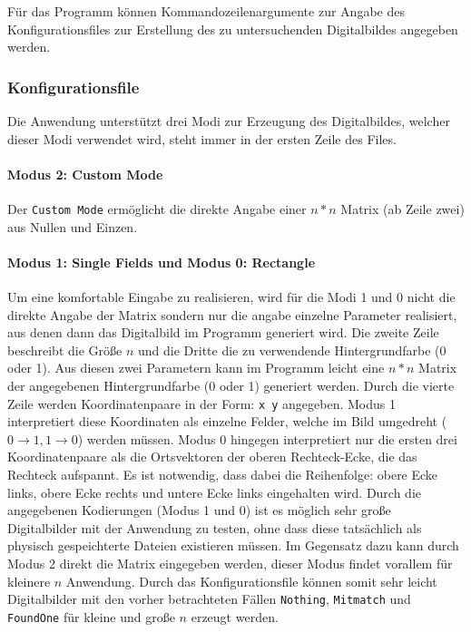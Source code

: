 Für das Programm können Kommandozeilenargumente zur Angabe des Konfigurationsfiles zur Erstellung des zu untersuchenden Digitalbildes angegeben werden.

\subsubsection{Konfigurationsfile}
Die Anwendung unterstützt drei Modi zur Erzeugung des Digitalbildes, welcher dieser Modi verwendet wird, steht immer in der ersten Zeile des Files.
\paragraph{Modus 2: Custom Mode}Der \texttt{Custom Mode} ermöglicht die direkte Angabe einer $n*n$ Matrix (ab Zeile zwei) aus Nullen und Einzen.
\paragraph{Modus 1: Single Fields und Modus 0: Rectangle}
Um eine komfortable Eingabe zu realisieren, wird für die Modi 1 und 0 nicht die direkte Angabe der Matrix sondern nur die angabe einzelne Parameter realisiert, aus denen dann das Digitalbild im Programm generiert wird.
Die zweite Zeile beschreibt die Größe $n$ und die Dritte die zu verwendende Hintergrundfarbe (0 oder 1). 
Aus diesen zwei Parametern kann im Programm leicht eine $n*n$ Matrix der angegebenen Hintergrundfarbe (0 oder 1) generiert werden.
Durch die vierte Zeile werden Koordinatenpaare in der Form: \texttt{x y} angegeben. Modus 1 interpretiert diese Koordinaten als einzelne Felder, welche im Bild umgedreht \linebreak ($0 \rightarrow 1,1 \rightarrow 0$) werden müssen. 
Modus 0 hingegen interpretiert nur die ersten drei Koordinatenpaare als die Ortsvektoren der oberen Rechteck-Ecke, die das Rechteck aufspannt. 
Es ist notwendig, dass dabei die Reihenfolge: obere Ecke links, obere Ecke rechts und untere Ecke links eingehalten wird.
Durch die angegebenen Kodierungen (Modus 1 und 0) ist es möglich sehr große Digitalbilder mit der Anwendung zu testen, ohne dass diese tatsächlich  als physisch gespeichterte Dateien existieren müssen. 
Im Gegensatz dazu kann durch Modus 2 direkt die Matrix eingegeben werden, dieser Modus findet vorallem für kleinere $n$ Anwendung. 
Durch das Konfigurationsfile können somit sehr leicht Digitalbilder mit den vorher betrachteten Fällen \texttt{Nothing}, \texttt{Mitmatch} und \texttt{FoundOne} für kleine und große $n$ erzeugt werden.

